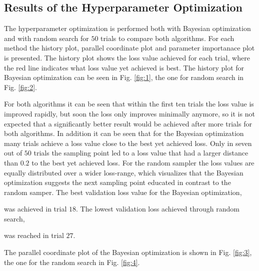\label{sec:results}

\subsection{Results of the Hyperparameter Optimization}
\label{subsec:perfmlp}

The hyperparameter optimization is performed both with Bayesian optimization and with random search for $50$ trials to compare both algorithms. For each method the history plot, 
parallel coordinate plot and parameter importanace plot is presented. The history plot shows the loss value achieved for each trial, where the red line indicates what loss value yet achieved is best.
The history plot for Bayesian optimization can be seen in Fig. \ref{fig:1}, the one for random search in Fig. \ref{fig:2}. 


For both algorithms it can be seen that within the first ten trials the loss value 
is improved rapidly, but soon the loss only improves minimally anymore, so it is not expected that a significantly better result would be achieved after more trials for both algorithms. 
In addition it can be seen that for the Bayesian optimization many trials achieve a loss value close to the best yet achieved loss. Only in seven out of $50$ trials the
sampling point led to a loss value that had a larger distance than $0.2$ to the best yet achieved loss. For the random sampler the loss values 
are equally distributed over a wider loss-range, which visualizes that the Bayesian optimization suggests the next sampling point educated in contrast to the random samper.
The best validation loss value for the Bayesian optimization,


was achieved in trial $18$. The lowest validation loss achieved through random search,


was reached in trial $27$. 

The parallel coordinate plot of the Bayesian optimization is shown in Fig. \ref{fig:3}, the one for the random search in Fig. \ref{fig:4}.



